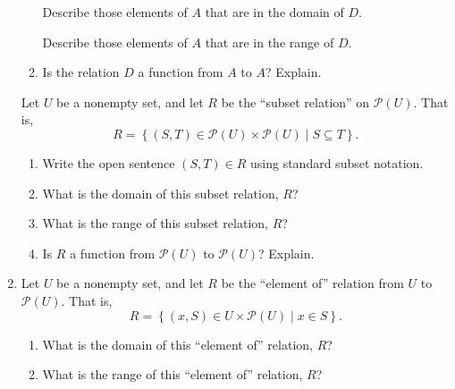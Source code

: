 \begin{enumerate}
\begin{enumerate}
  \yitem Describe those elements of  $A$  that are in the domain of  $D$.

  \yitem Describe those elements of  $A$  that are in the range of  $D$.

  \item Is the relation  $D$  a function from  $A$  to  $A$?  Explain.

\end{enumerate}

\xitem \label{exer:sec71-4}
Let  $U$  be a nonempty set, and let  $R$  be the ``subset relation'' on  
$\mathcal{P}( U )$.  That is, 
\[
R = \left\{ { {\left( {S, T} \right) \in \mathcal{P}( U ) \times \mathcal{P}( U ) } \mid S \subseteq T} \right\}\!.
\]

\begin{enumerate}
  \item Write the open sentence  $\left( {S, T} \right) \in R$ using standard subset notation.

  \item What is the domain of this subset relation, $R$?

  \item What is the range of this subset relation, $R$?


  \item Is  $R$  a function from  $\mathcal{P}( U )$  to  
        $\mathcal{P}( U )$?  Explain.
\end{enumerate} 

\item Let  $U$  be a nonempty set, and let  $R$  be the ``element of''  relation from  $U$  to   $\mathcal{P}\left( U \right)$.  That is, \label{exer:sec71-5}
\[
R = \left\{ { {\left( {x, S} \right) \in U \times \mathcal{P}( U ) } \mid x \in S} \right\}\!.
\]

\begin{enumerate} 

  \item What is the domain of this ``element of'' relation, $R$?

  \item What is the range of this ``element of'' relation, $R$?



\end{enumerate}
\end{enumerate}
